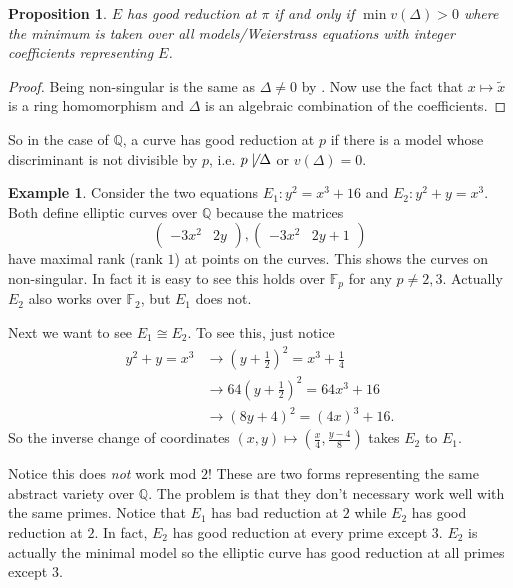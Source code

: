 \documentclass[11pt]{article}
\newcommand{\BB}[1]{\mathbb{#1}} %
\newcommand{\QQ}{\BB{Q}}
\newcommand{\FF}{\BB{F}}
\theoremstyle{plain}%
\newtheorem{prop}[thm]{Proposition}
\theoremstyle{definition}
\newtheorem{ex}[thm]{Example}
\theoremstyle{remark}
\begin{document}
\begin{prop}
	$E$ has good reduction at $\pi$ if and only if $\min v(\Delta)>0$ where the minimum is taken over all models/Weierstrass equations with integer coefficients representing $E$.
\end{prop}
\begin{proof}
	Being non-singular is the same as $\Delta\neq 0$ by \cite[Prop. III.1.4(a)]{silverman1}. Now use the fact that $x\mapsto\tilde{x}$ is a ring homomorphism and $\Delta$ is an algebraic combination of the coefficients.
\end{proof}

So in the case of $\QQ$, a curve has good reduction at $p$ if there is a model whose discriminant is not divisible by $p$, i.e. $p\not\mid\Delta$ or $v(\Delta) = 0$.

\begin{ex}
	Consider the two equations $E_1: y^2=x^3+16$ and $E_2: y^2 + y = x^3$. Both define elliptic curves over $\QQ$ because the matrices
	$$
	\begin{pmatrix}
		-3x^2 & 2y
	\end{pmatrix}
	,
	\begin{pmatrix}
		-3x^2 & 2y+1
	\end{pmatrix}
	$$
	have maximal rank (rank $1$) at points on the curves. This shows the curves on non-singular. In fact it is easy to see this holds over $\FF_p$ for any $p\neq 2,3$. Actually $E_2$ also works over $\FF_2$, but $E_1$ does not.
	
	Next we want to see $E_1\cong E_2$. To see this, just notice
	\begin{align*}
		y^2 + y = x^3
		&\to
		\left(y+\frac{1}{2}\right)^2 = x^3 + \frac{1}{4}
		\\
		&\to
		64\left(y+\frac{1}{2}\right)^2 = 64x^3 + 16
		\\
		&\to
		\left(8y+4\right)^2 = (4x)^3 + 16.
	\end{align*}
	So the inverse change of coordinates $(x,y)\mapsto \left(\frac{x}{4},\frac{y-4}{8}\right)$ takes $E_2$ to $E_1$.
	
	Notice this does \emph{not} work mod $2$! These are two forms representing the same abstract variety over $\QQ$. The problem is that they don't necessary work well with the same primes. Notice that $E_1$ has bad reduction at $2$ while $E_2$ has good reduction at $2$. In fact, $E_2$ has good reduction at every prime except $3$. $E_2$ is actually the minimal model so the elliptic curve has good reduction at all primes except $3$. 
\end{ex}
\end{document}
